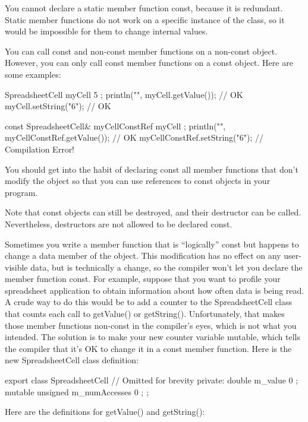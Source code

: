 You cannot declare a static member function const, because it is redundant. Static member functions do not work on a specific instance of the class, so it would be impossible for them to change internal values.

You can call const and non-const member functions on a non-const object. However, you can only call const member functions on a const object. Here are some examples:

\begin{cpp}
SpreadsheetCell myCell { 5 };
println("{}", myCell.getValue()); // OK
myCell.setString("6"); // OK

const SpreadsheetCell& myCellConstRef { myCell };
println("{}", myCellConstRef.getValue()); // OK
myCellConstRef.setString("6"); // Compilation Error!
\end{cpp}

You should get into the habit of declaring const all member functions that don’t modify the object so that you can use references to const objects in your program.

Note that const objects can still be destroyed, and their destructor can be called. Nevertheless, destructors are not allowed to be declared const.


Sometimes you write a member function that is “logically” const but happens to change a data member of the object. This modification has no effect on any user-visible data, but is technically a change, so the compiler won’t let you declare the member function const. For example, suppose that you want to profile your spreadsheet application to obtain information about how often data is being read. A crude way to do this would be to add a counter to the SpreadsheetCell class that counts each call to getValue() or getString(). Unfortunately, that makes those member functions non-const in the compiler’s eyes, which is not what you intended. The solution is to make your new counter variable mutable, which tells the compiler that it’s OK to change it in a const member function. Here is the new SpreadsheetCell class definition:

\begin{cpp}
export class SpreadsheetCell
{
    // Omitted for brevity
    private:
        double m_value { 0 };
        mutable unsigned m_numAccesses { 0 };
};
\end{cpp}

Here are the definitions for getValue() and getString():


